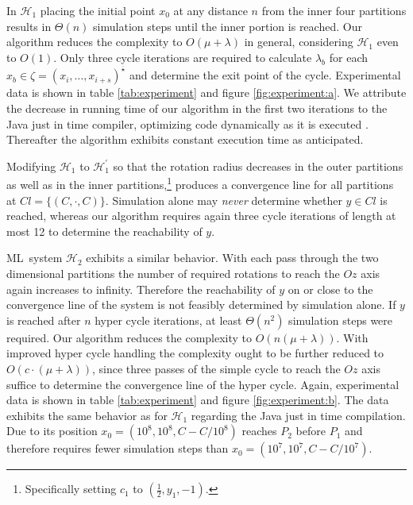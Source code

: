 \documentclass[copyright,creativecommons]{packages/eptcs}
\newcommand{\ml}{\mbox{ML}}
\newcommand{\cycle}{\zeta}
\newcommand{\seq}{\overline{\star}}
\begin{document}
In $\mathcal{H}_1$ placing the initial point $x_0$ at any distance $n$ from the inner four partitions results in $\Theta(n)$ simulation steps until the inner portion is reached. Our algorithm reduces the complexity to $O(\mu + \lambda)$ in general, considering $\mathcal{H}_1$ even to $O(1)$. Only three cycle iterations are required to calculate $\lambda_b$ for each $x_b \in \cycle=(x_{i}, \dots, x_{i+s})^{\seq}$ and determine the exit point of the cycle. Experimental data is shown in table \ref{tab:experiment} and figure \ref{fig:experiment:a}. We attribute the decrease in running time of our algorithm in the first two iterations to the Java just in time compiler, optimizing code dynamically as it is executed \cite{CetAl97}. Thereafter the algorithm exhibits constant execution time as anticipated.

Modifying $\mathcal{H}_1$ to $\mathcal{H}_1^\prime$ so that the rotation radius decreases in the outer partitions as well as in the inner partitions,\footnote{Specifically setting $c_1$ to $(\frac{1}{2},y_1,-1)$.} produces a convergence line for all partitions at $Cl = \{(C,\cdot, C)\}$. Simulation alone may \emph{never} determine whether $y \in Cl$ is reached, whereas our algorithm requires again three cycle iterations of length at most 12 to determine the reachability of $y$.

\ml~system $\mathcal{H}_2$ exhibits a similar behavior. With each pass through the two dimensional partitions the number of required rotations to reach the $Oz$ axis again increases to infinity. Therefore the reachability of $y$ on or close to the convergence line of the system is not feasibly determined by simulation alone. If $y$ is reached after $n$ hyper cycle iterations, at least $\Theta(n^2)$ simulation steps were required. Our algorithm reduces the complexity to $O(n(\mu + \lambda))$. With improved hyper cycle handling the complexity ought to be further reduced to $O(c \cdot (\mu + \lambda))$, since three passes of the simple cycle to reach the $Oz$ axis suffice to determine the convergence line of the hyper cycle. Again, experimental data is shown in table \ref{tab:experiment} and figure \ref{fig:experiment:b}. The data exhibits the same behavior as for $\mathcal{H}_1$ regarding the Java just in time compilation. Due to its position $x_0 = (10^8, 10^8, C - C/10^8)$ reaches $P_2$ before $P_1$ and therefore requires fewer simulation steps than $x_0 = (10^7, 10^7, C - C/10^7)$.
\end{document}
